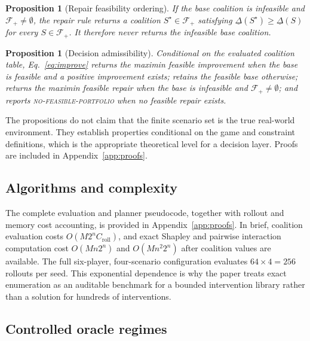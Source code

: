 \documentclass[review]{elsarticle}
\theoremstyle{plain}
\newtheorem{proposition}[theorem]{Proposition}
\theoremstyle{definition}
\theoremstyle{remark}
\begin{document}
\begin{proposition}[Repair feasibility ordering]\label{prop:repair}
If the base coalition is infeasible and $\mathcal F_+\neq\emptyset$, the repair rule returns a coalition $S^\star\in\mathcal F_+$ satisfying $\underline\Delta(S^\star)\geq\underline\Delta(S)$ for every $S\in\mathcal F_+$. It therefore never returns the infeasible base coalition.
\end{proposition}

\begin{proposition}[Decision admissibility]\label{prop:admissibility}
Conditional on the evaluated coalition table, Eq.~\eqref{eq:improve} returns the maximin feasible improvement when the base is feasible and a positive improvement exists; retains the feasible base otherwise; returns the maximin feasible repair when the base is infeasible and $\mathcal F_+\neq\emptyset$; and reports \textsc{no-feasible-portfolio} when no feasible repair exists.
\end{proposition}

The propositions do not claim that the finite scenario set is the true real-world environment. They establish properties conditional on the game and constraint definitions, which is the appropriate theoretical level for a decision layer. Proofs are included in Appendix~\ref{app:proofs}.

\subsection{Algorithms and complexity}
The complete evaluation and planner pseudocode, together with rollout and memory cost accounting, is provided in Appendix~\ref{app:proofs}. In brief, coalition evaluation costs $O(M2^nC_{\mathrm{roll}})$, and exact Shapley and pairwise interaction computation cost $O(Mn2^n)$ and $O(Mn^2 2^n)$ after coalition values are available. The full six-player, four-scenario configuration evaluates $64\times4=256$ rollouts per seed. This exponential dependence is why the paper treats exact enumeration as an auditable benchmark for a bounded intervention library rather than a solution for hundreds of interventions.

\subsection{Controlled oracle regimes}
\end{document}
